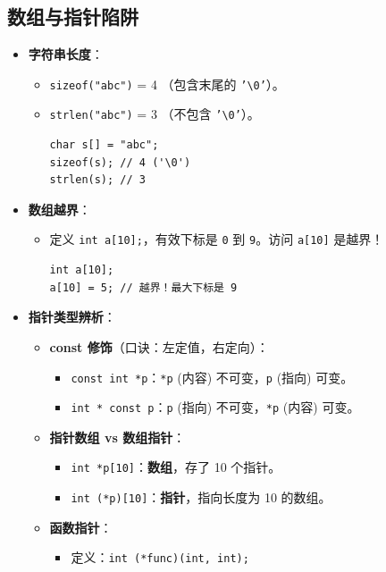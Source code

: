 \documentclass[a4paper,12pt]{article}
\begin{document}
\subsection{数组与指针陷阱}
\begin{itemize}
    \item \textbf{字符串长度}：
    \begin{itemize}
        \item \texttt{sizeof("abc")} = 4 （包含末尾的 \texttt{'\textbackslash 0'}）。
        \item \texttt{strlen("abc")} = 3 （不包含 \texttt{'\textbackslash 0'}）。
\begin{lstlisting}
char s[] = "abc";
sizeof(s); // 4 ('\0')
strlen(s); // 3
\end{lstlisting}
    \end{itemize}
    \item \textbf{数组越界}：
    \begin{itemize}
        \item 定义 \texttt{int a[10];}，有效下标是 \texttt{0} 到 \texttt{9}。访问 \texttt{a[10]} 是越界！
\begin{lstlisting}
int a[10];
a[10] = 5; // 越界！最大下标是 9
\end{lstlisting}
    \end{itemize}
    \item \textbf{指针类型辨析}：
    \begin{itemize}
        \item \textbf{const 修饰}（口诀：左定值，右定向）：
        \begin{itemize}
            \item \texttt{const int *p}：\texttt{*p} (内容) 不可变，\texttt{p} (指向) 可变。
            \item \texttt{int * const p}：\texttt{p} (指向) 不可变，\texttt{*p} (内容) 可变。
        \end{itemize}
        \item \textbf{指针数组 vs 数组指针}：
        \begin{itemize}
            \item \texttt{int *p[10]}：\textbf{数组}，存了 10 个指针。
            \item \texttt{int (*p)[10]}：\textbf{指针}，指向长度为 10 的数组。
        \end{itemize}
        \item \textbf{函数指针}：
        \begin{itemize}
            \item 定义：\texttt{int (*func)(int, int);}

\end{itemize}
\end{itemize}
\end{itemize}
\end{document}
